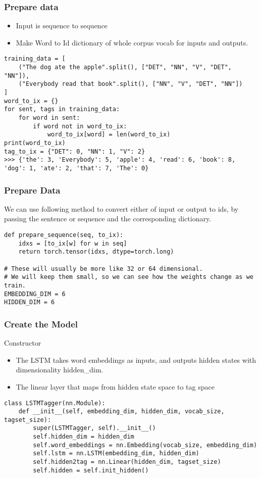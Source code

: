 \begin{frame}[fragile]
\frametitle{Prepare data}
\begin{itemize}
\item Input is sequence to sequence
\item Make Word to Id dictionary of whole corpus vocab for inputs and outputs.
\end{itemize}
\begin{lstlisting}
training_data = [
    ("The dog ate the apple".split(), ["DET", "NN", "V", "DET", "NN"]),
    ("Everybody read that book".split(), ["NN", "V", "DET", "NN"])
]
word_to_ix = {}
for sent, tags in training_data:
    for word in sent:
        if word not in word_to_ix:
            word_to_ix[word] = len(word_to_ix)
print(word_to_ix)
tag_to_ix = {"DET": 0, "NN": 1, "V": 2}
>>> {'the': 3, 'Everybody': 5, 'apple': 4, 'read': 6, 'book': 8, 'dog': 1, 'ate': 2, 'that': 7, 'The': 0}
\end{lstlisting}      
\end{frame} 

\begin{frame}[fragile]
\frametitle{Prepare Data}
We can use following method to convert either of input or output to ids, by passing the sentence or sequence and the corresponding dictionary.
\begin{lstlisting}
def prepare_sequence(seq, to_ix):
    idxs = [to_ix[w] for w in seq]
    return torch.tensor(idxs, dtype=torch.long)
	
# These will usually be more like 32 or 64 dimensional.
# We will keep them small, so we can see how the weights change as we train.
EMBEDDING_DIM = 6
HIDDEN_DIM = 6	
\end{lstlisting}      
\end{frame} 

\begin{frame}[fragile]
\frametitle{Create the Model}
Constructor
\begin{itemize}
\item The LSTM takes word embeddings as inputs, and outputs hidden states with dimensionality hidden\_dim.
\item The linear layer that maps from hidden state space to tag space
\end{itemize}
\begin{lstlisting}
class LSTMTagger(nn.Module):
    def __init__(self, embedding_dim, hidden_dim, vocab_size, tagset_size):
        super(LSTMTagger, self).__init__()
        self.hidden_dim = hidden_dim
        self.word_embeddings = nn.Embedding(vocab_size, embedding_dim)
        self.lstm = nn.LSTM(embedding_dim, hidden_dim)
        self.hidden2tag = nn.Linear(hidden_dim, tagset_size)
        self.hidden = self.init_hidden()
	
\end{lstlisting}      
\end{frame} 

